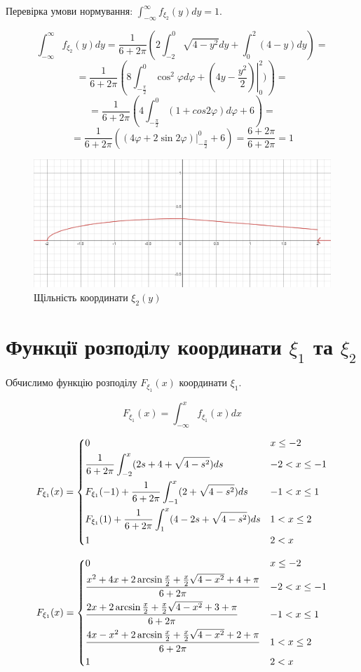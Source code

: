\documentclass[14pt, a4paper, ukrainian]{extreport}
\begin{document}
	Перевірка умови нормування: $\int_{-\infty}^{\infty}f_{\xi_2}(y)dy = 1$.
	
	$$\int_{-\infty}^{\infty}f_{\xi_2}(y)dy = \dfrac{1}{6+2\pi}\left(2\int_{-2}^{0}\sqrt{4-y^2}dy + \int_{0}^{2}(4-y)dy \right) = $$
	$$ = \dfrac{1}{6+2\pi} \left(8\int_{-\frac{\pi}{2}}^{0}\cos^2{\varphi}d\varphi + \left.(4y - \dfrac{y^2}{2})\right|_0^2)\right) =$$ 
	$$ = \dfrac{1}{6+2\pi}\left(4\int_{-\frac{\pi}{2}}^{0}(1+cos{2\varphi})d\varphi + 6\right) = $$
	$$ = \dfrac{1}{6 + 2\pi} \left(\left.\left(4\varphi + 2\sin{2\varphi}\right)\right|_{-\frac{\pi}{2}}^0 + 6\right) = \frac{6 + 2\pi}{6 + 2\pi} = 1 $$
	
	\begin{figure}[H]
		\centering
		\includegraphics[width=\textwidth]{./Image/Im_07_f2.png}
		\caption{Щільність координати $\xi_2(y)$}
		\label{im:f2}
	\end{figure}
	
	
	\section{Функції розподілу координати $\xi_1$ та $\xi_2$}
	
	Обчислимо функцію розподілу $F_{\xi_1}(x)$ координати $\xi_1$.
	
	$$F_{\xi_1}(x) = \int_{-\infty}^{x}f_{\xi_1}(x)dx$$
	
		$$F_{\xi_1}(x) = \begin{dcases}
		0 & x \le -2\\
		\dfrac{1}{6+2\pi} \int_{-2}^{x}(2s+4+\sqrt{4-s^2})ds& -2 < x \le -1\\
		F_{\xi_1}(-1) + \dfrac{1}{6+2\pi} \int_{-1}^{x}(2+\sqrt{4-s^2})ds & -1 < x \le 1\\
		F_{\xi_1}(1)+\dfrac{1}{6+2\pi} \int_{1}^{x}(4-2s+\sqrt{4-s^2})ds & 1 < x \le 2\\
		1 & 2 < x
	\end{dcases} 
	$$
	
	$$F_{\xi_1}(x) = \begin{dcases}
		0 & x \le -2\\
		\dfrac{x^2 + 4x + 2\arcsin{\frac{x}{2}} + \frac{x}{2}\sqrt{4-x^2} + 4 + \pi}{6+2\pi} & -2 < x \le -1\\
		\dfrac{2x + 2\arcsin{\frac{x}{2}} + \frac{x}{2}\sqrt{4-x^2} + 3 + \pi}{6+2\pi} & -1 < x \le 1\\
		\dfrac{4x - x^2 + 2\arcsin{\frac{x}{2}} + \frac{x}{2}\sqrt{4-x^2}+  2 + \pi}{6+2\pi} & 1 < x \le 2\\
		1 & 2 < x
	\end{dcases} 
	$$
	
\end{document}
